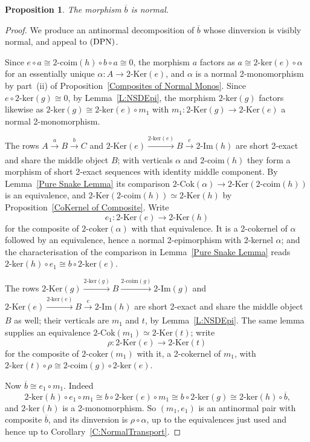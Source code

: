 \documentclass[reqno,a4paper]{amsart}
\numberwithin{equation}{section}
\theoremstyle{plain}
\newtheorem{proposition}[subsection]{Proposition}
\theoremstyle{definition}
\def\nameit#1{\textrm{#1}~}
\def\prox{\nameit{Proposition}}
\def\corx{\nameit{Corollary}}
\def\lemx{\nameit{Lemma}}
\newcommand{\comp}{\circ}
\newcommand{\iso}{\cong}
\newcommand{\ov}[1]{\overline{#1}}
\renewcommand{\1}{\onecat{1}}
\newcommand{\DPN}{\textup{(DPN)}}
\newcommand{\TwoKer}{\ensuremath{2\text{-}\mathrm{Ker}}}
\newcommand{\TwoCoker}{\ensuremath{2\text{-}\mathrm{Cok}}}
\newcommand{\twoker}{\ensuremath{2\text{-}\mathrm{ker}}}
\newcommand{\twocoker}{\ensuremath{2\text{-}\mathrm{coker}}}
\newcommand{\TwoImg}{\ensuremath{2\text{-}\mathrm{Im}}}
\newcommand{\twocoim}{\ensuremath{2\text{-}\mathrm{coim}}}
\newcommand{\aar}[2][]{\xrightarrow[#1]{#2}}
\begin{document}
\begin{proposition}\label{P:NSDbbar}
	The morphism \(\ov{b}\) is normal.
\end{proposition}
\begin{proof}
	We produce an antinormal decomposition of \(\ov{b}\) whose dinversion is visibly normal, and appeal to \(\DPN\).

	Since \(e\comp a\iso\twocoim(h)\comp b\comp a\iso 0\), the morphism \(a\) factors as \(a\iso\twoker(e)\comp\alpha\) for an essentially unique \(\alpha\colon A\to\TwoKer(e)\), and \(\alpha\) is a normal 2-monomorphism by part~\textup{(ii)} of \prox\ref{Composites of Normal Monos}. Since \(e\comp\twoker(g)\iso 0\), by \lemx\ref{L:NSDEpi}, the morphism \(\twoker(g)\) factors likewise as \(\twoker(g)\iso\twoker(e)\comp m_1\) with \(m_1\colon\TwoKer(g)\to\TwoKer(e)\) a normal 2-monomorphism.

	The rows \(A\aar{a}B\aar{b}C\) and \(\TwoKer(e)\aar{\twoker(e)}B\aar{e}\TwoImg(h)\) are short 2-exact and share the middle object \(B\); with verticals \(\alpha\) and \(\twocoim(h)\) they form a morphism of short 2-exact sequences with identity middle component. By \lemx\ref{Pure Snake Lemma} its comparison \(\TwoCoker(\alpha)\to\TwoKer(\twocoim(h))\) is an equivalence, and \(\TwoKer(\twocoim(h))\simeq\TwoKer(h)\) by \prox\ref{CoKernel of Composite}. Write
	\[
		e_1\colon\TwoKer(e)\longrightarrow\TwoKer(h)
	\]
	for the composite of \(\twocoker(\alpha)\) with that equivalence. It is a 2-cokernel of \(\alpha\) followed by an equivalence, hence a normal 2-epimorphism with 2-kernel \(\alpha\); and the characterisation of the comparison in \lemx\ref{Pure Snake Lemma} reads \(\twoker(h)\comp e_1\iso b\comp\twoker(e)\).

	The rows \(\TwoKer(g)\aar{\twoker(g)}B\aar{\twocoim(g)}\TwoImg(g)\) and \(\TwoKer(e)\aar{\twoker(e)}B\aar{e}\TwoImg(h)\) are short 2-exact and share the middle object \(B\) as well; their verticals are \(m_1\) and \(t\), by \lemx\ref{L:NSDEpi}. The same lemma supplies an equivalence \(\TwoCoker(m_1)\simeq\TwoKer(t)\); write
	\[
		\rho\colon\TwoKer(e)\longrightarrow\TwoKer(t)
	\]
	for the composite of \(\twocoker(m_1)\) with it, a 2-cokernel of \(m_1\), with \(\twoker(t)\comp\rho\iso\twocoim(g)\comp\twoker(e)\).

	Now \(\ov{b}\iso e_1\comp m_1\). Indeed
	\[
		\twoker(h)\comp e_1\comp m_1\iso b\comp\twoker(e)\comp m_1\iso b\comp\twoker(g)\iso\twoker(h)\comp\ov{b}\text{,}
	\]
	and \(\twoker(h)\) is a 2-monomorphism. So \((m_1,e_1)\) is an antinormal pair with composite \(\ov{b}\), and its dinversion is \(\rho\comp\alpha\), up to the equivalences just used and hence up to \corx\ref{C:NormalTransport}.


\end{proof}
\end{document}
